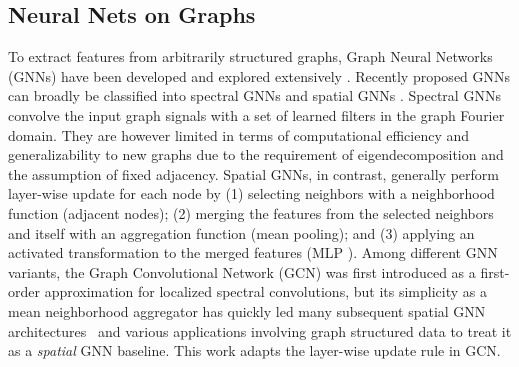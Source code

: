\documentclass[10pt,twocolumn,letterpaper]{article}
\makeatletter
\renewcommand{\paragraph}{\@startsection{paragraph}{4}{\z@}{1.5ex \@plus 1ex \@minus .2ex}{-1em}{\normalfont\normalsize\bfseries}}
\makeatother
\begin{document}
\subsection{Neural Nets on Graphs}

\paragraph{Architectures.}
To extract features from arbitrarily structured graphs, Graph Neural Networks (GNNs) have been developed and explored extensively \cite{chebynet, GCN, spectral-cnn-yann-lecun, diffusion-cnn, graph-sage, graph-attention-networks,GIN-how-powerful-are-gnns,mixhop,graph-unet,hammond-spectral-2011,adaptive-gcn}.
Recently proposed GNNs can broadly be classified into spectral GNNs \cite{spectral-cnn-yann-lecun, hammond-spectral-2011, adaptive-gcn,spectral-cnn-yann-lecun-2,GCN} and spatial GNNs \cite{GCN,GIN-how-powerful-are-gnns,graph-sage,diffpool,deep-graph-infomax,mixhop,simplifying-gcns}.
Spectral GNNs convolve the input graph signals with a set of learned filters in the graph Fourier domain.
They are however limited in terms of computational efficiency and generalizability to new graphs due to the requirement of eigendecomposition and the assumption of fixed adjacency.
Spatial GNNs, in contrast, generally perform layer-wise update for each node by (1) selecting neighbors with a neighborhood function (\eg adjacent nodes); (2) merging the features from the selected neighbors and itself with an aggregation function (\eg mean pooling); and (3) applying an activated transformation to the merged features (\eg MLP \cite{GIN-how-powerful-are-gnns}). Among different GNN variants, the Graph Convolutional Network (GCN) \cite{GCN} was first introduced as a first-order approximation for localized spectral convolutions, but its simplicity as a mean neighborhood aggregator \cite{GIN-how-powerful-are-gnns, graph-survey-2019} has quickly led many subsequent spatial GNN architectures~\cite{GIN-how-powerful-are-gnns, mixhop, simplifying-gcns, graph-unet} and various applications involving graph structured data \cite{video-as-spacetime-region-graphs, graph-wavenet, stgcn-traffic-2017, ST-GCN, 2s-AGCN, attention-gcn-lstm-cvpr2019, AS-GCN-skeleton-cvpr19} to treat it as a \textit{spatial} GNN baseline. This work adapts the layer-wise update rule in GCN.
\end{document}
